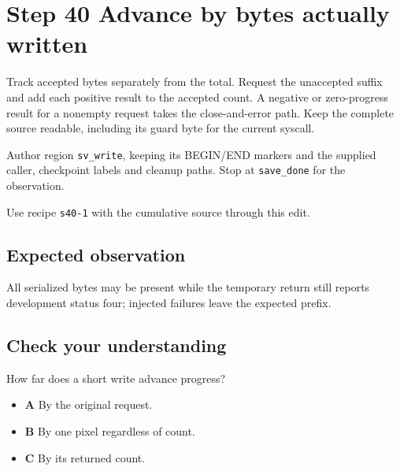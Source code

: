 \section{Step 40 Advance by bytes actually written}\label{ppm-s40}

Track accepted bytes separately from the total. Request the unaccepted suffix and add each positive result to the accepted count. A negative or zero-progress result for a nonempty request takes the close-and-error path. Keep the complete source readable, including its guard byte for the current syscall.

Author region \texttt{sv\_write}, keeping its BEGIN/END markers and the supplied caller, checkpoint labels and cleanup paths. Stop at \texttt{save\_done} for the observation.

Use recipe \texttt{s40-1} with the cumulative source through this edit.

\subsection{Expected observation}
All serialized bytes may be present while the temporary return still reports development status four; injected failures leave the expected prefix.

\subsection{Check your understanding}
How far does a short write advance progress?

\begin{itemize}
  \item \textbf{A} By the original request.
  \item \textbf{B} By one pixel regardless of count.
  \item \textbf{C} By its returned count.
\end{itemize}
